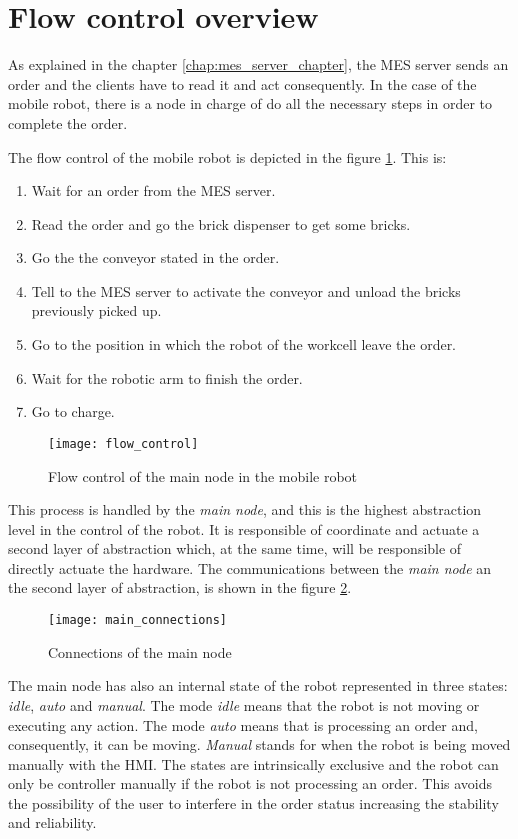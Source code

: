 \section{Flow control overview} %
\label{sec:mr_flow_control_overview}
As explained in the chapter \ref{chap:mes_server_chapter}, the MES server sends an order and the clients have to read it and act consequently.
In the case of the mobile robot, there is a node in charge of do all the necessary steps in order to complete the order.

The flow control of the mobile robot is depicted in the figure \ref{fig:flow_control}.
This is:
\begin{enumerate}
	\item Wait for an order from the MES server.
	\item Read the order and go the brick dispenser to get some bricks.
	\item Go the the conveyor stated in the order.
	\item Tell to the MES server to activate the conveyor and unload the bricks previously picked up.
	\item Go to the position in which the robot of the workcell leave the order.
	\item Wait for the robotic arm to finish the order.
	\item Go to charge.
\end{enumerate}

\begin{figure}[htb]
	\centering
	\texttt{[image: flow\_control]}
	\caption{Flow control of the main node in the mobile robot}
	\label{fig:flow_control}
\end{figure}

This process is handled by the \emph{main node}, and this is the highest abstraction level in the control of the robot.
It is responsible of coordinate and actuate a second layer of abstraction which, at the same time, will be responsible of directly actuate the hardware.
The communications between the \emph{main node} an the second layer of abstraction, is shown in the figure \ref{fig:main_connections}.

\begin{figure}[htb]
	\centering
	\texttt{[image: main\_connections]}
	\caption{Connections of the main node}
	\label{fig:main_connections}
\end{figure}

The main node has also an internal state of the robot represented in three states: \emph{idle}, \emph{auto} and \emph{manual}. 
The mode \emph{idle} means that the robot is not moving or executing any action. 
The mode \emph{auto} means that is processing an order and, consequently, it can be moving. \emph{Manual} stands for when the robot is being moved manually with the HMI. 
The states are intrinsically exclusive and the robot can only be controller manually if the robot is not processing an order.
This avoids the possibility of the user to interfere in the order status increasing the stability and reliability.

